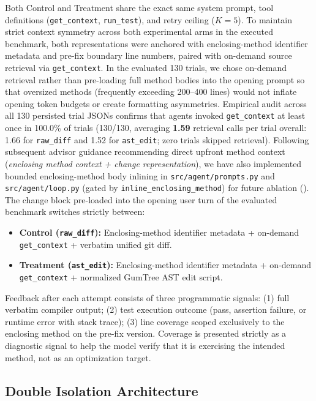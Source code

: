 \documentclass[12pt, a4paper]{article}
\begin{document}
Both Control and Treatment share the exact same system prompt, tool definitions (\texttt{get\_context}, \texttt{run\_test}), and retry ceiling ($K=5$).
To maintain strict context symmetry across both experimental arms in the executed benchmark, both representations were anchored with enclosing-method identifier metadata and pre-fix boundary line numbers, paired with on-demand source retrieval via \texttt{get\_context}.
In the evaluated 130 trials, we chose on-demand retrieval rather than pre-loading full method bodies into the opening prompt so that oversized methods (frequently exceeding 200--400 lines) would not inflate opening token budgets or create formatting asymmetries.
Empirical audit across all 130 persisted trial JSONs confirms that agents invoked \texttt{get\_context} at least once in 100.0\% of trials (130/130, averaging \textbf{1.59} retrieval calls per trial overall: 1.66 for \texttt{raw\_diff} and 1.52 for \texttt{ast\_edit}; zero trials skipped retrieval).
Following subsequent advisor guidance recommending direct upfront method context (\emph{enclosing method context + change representation}), we have also implemented bounded enclosing-method body inlining in \texttt{src/agent/prompts.py} and \texttt{src/agent/loop.py} (gated by \texttt{inline\_enclosing\_method}) for future ablation ().
The change block pre-loaded into the opening user turn of the evaluated benchmark switches strictly between:
\begin{itemize}[leftmargin=*]
  \item \textbf{Control (\texttt{raw\_diff}):} Enclosing-method identifier metadata + on-demand \texttt{get\_context} + verbatim unified git diff.
  \item \textbf{Treatment (\texttt{ast\_edit}):} Enclosing-method identifier metadata + on-demand \texttt{get\_context} + normalized GumTree AST edit script.
\end{itemize}

Feedback after each attempt consists of three programmatic signals:
(1) full verbatim compiler output;
(2) test execution outcome (pass, assertion failure, or runtime error with stack trace);
(3) line coverage scoped exclusively to the enclosing method on the pre-fix version.
Coverage is presented strictly as a diagnostic signal to help the model verify that it is exercising the intended method, not as an optimization target.

\subsection{Double Isolation Architecture}\label{sec:isolation}
\end{document}
